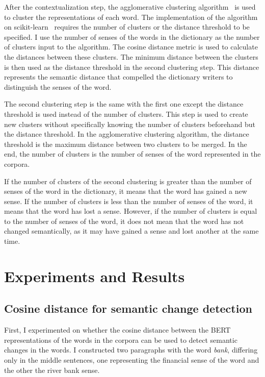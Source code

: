 \documentclass[11pt]{article}
\begin{document}
After the contextualization step, the agglomerative clustering algorithm~\cite{Florek1951SurLL} is used to cluster the representations of each word.
The implementation of the algorithm on scikit-learn~\cite{scikit-learn} requires the number of clusters or the distance threshold to be specified.
I use the number of senses of the words in the dictionary as the number of clusters input to the algorithm.
The cosine distance metric is used to calculate the distances between these clusters.
The minimum distance between the clusters is then used as the distance threshold in the second clustering step.
This distance represents the semantic distance that compelled the dictionary writers to distinguish the senses of the word.

The second clustering step is the same with the first one except the distance threshold is used instead of the number of clusters.
This step is used to create new clusters without specifically knowing the number of clusters beforehand but the distance threshold.
In the agglomerative clustering algorithm, the distance threshold is the maximum distance between two clusters to be merged.
In the end, the number of clusters is the number of senses of the word represented in the corpora.

If the number of clusters of the second clustering is greater than the number of senses of the word in the dictionary, it means that the word has gained a new sense.
If the number of clusters is less than the number of senses of the word, it means that the word has lost a sense.
However, if the number of clusters is equal to the number of senses of the word, it does not mean that the word has not changed semantically, as it may have gained a sense and lost another at the same time.

\section{Experiments and Results}

\subsection{Cosine distance for semantic change detection}

First, I experimented on whether the cosine distance between the BERT representations of the words in the corpora can be used to detect semantic changes in the words.
I constructed two paragraphs with the word \textit{bank}, differing only in the middle sentences, one representing the financial sense of the word and the other the river bank sense.
\end{document}
